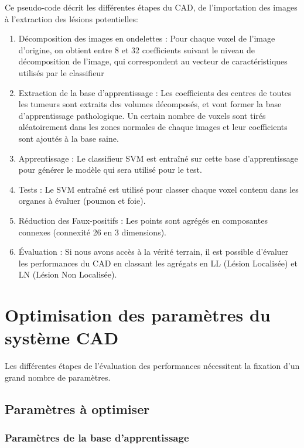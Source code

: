 Ce pseudo-code décrit les différentes étapes du CAD, de l'importation des images à l'extraction des lésions potentielles:

\begin{enumerate}
 \item Décomposition des images en ondelettes : Pour chaque voxel de l'image d'origine, on obtient entre 8 et 32 coefficients suivant le niveau de décomposition de l'image, qui correspondent au vecteur de caractéristiques utilisés par le classifieur
 \item Extraction de la base d'apprentissage : Les coefficients des centres de toutes les tumeurs sont extraits des volumes décomposés, et vont former la base d'apprentissage pathologique. Un certain nombre de voxels sont tirés aléatoirement dans les zones normales de chaque images et leur coefficients sont ajoutés à la base saine.
 \item Apprentissage : Le classifieur SVM est entraîné sur cette base d'apprentissage pour générer le modèle qui sera utilisé pour le test.
 \item Tests : Le SVM entraîné est utilisé pour classer chaque voxel contenu dans les organes à évaluer (poumon et foie).
 \item Réduction des Faux-positifs : Les points sont agrégés en composantes connexes (connexité 26 en 3 dimensions).
 \item Évaluation : Si nous avons accès à la vérité terrain, il est possible d'évaluer les performances du CAD en classant les agrégats en LL (Lésion Localisée) et LN (Lésion Non Localisée).
\end{enumerate}



\section{Optimisation des paramètres du système CAD} %
\label{lab:optim}

Les différentes étapes de l'évaluation des performances nécessitent la fixation d'un grand nombre de paramètres.

\subsection{Paramètres à optimiser} %


\subsubsection{Paramètres de la base d'apprentissage}

